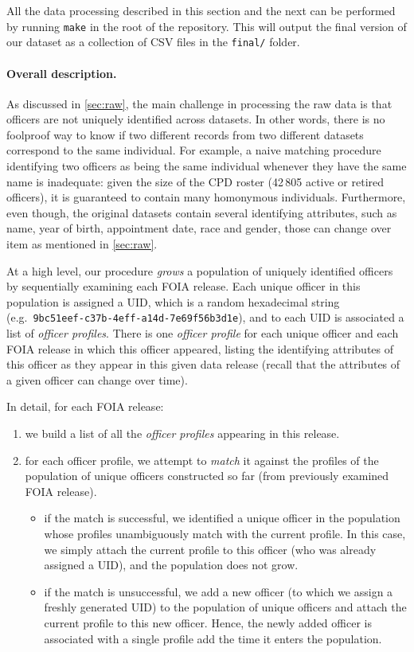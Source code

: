 All the data processing described in this section and the next can be performed
by running \texttt{make} in the root of the repository. This will output the
final version of our dataset as a collection of CSV files in the
\texttt{final/} folder.

\paragraph{Overall description.}
As discussed in \cref{sec:raw}, the main challenge in processing the raw data
is that officers are not uniquely identified across datasets. In other words,
there is no foolproof way to know if two different records from two different
datasets correspond to the same individual. For example, a naive matching
procedure identifying two officers as being the same individual whenever they
have the same name is inadequate: given the size of the CPD roster (42\,805
active or retired officers), it is guaranteed to contain many homonymous
individuals. Furthermore, even though, the original datasets contain several
identifying attributes, such as name, year of birth, appointment date, race and
gender, those can change over item as mentioned in \cref{sec:raw}.

At a high level, our procedure \emph{grows} a population of uniquely identified
officers by sequentially examining each FOIA release. Each unique officer in
this population is assigned a UID, which is a random hexadecimal string (e.g.\
\texttt{9bc51eef-c37b-4eff-a14d-7e69f56b3d1e}), and to each UID is associated
a list of \emph{officer profiles}. There is one \emph{officer profile} for each
unique officer and each FOIA release in which this officer appeared, listing
the identifying attributes of this officer as they appear in this given data
release (recall that the attributes of a given officer can change over time).

In detail, for each FOIA release:
\begin{enumerate}
	\item we build a list of all the \emph{officer profiles} appearing in this
		release.
	\item for each officer profile, we attempt to \emph{match} it against the
		profiles of the population of unique officers constructed so far (from
		previously examined FOIA release).
		\begin{itemize}
			\item if the match is successful, we identified a unique officer in
				the population whose profiles unambiguously match with the
				current profile. In this case, we simply attach the current
				profile to this officer (who was already assigned a UID), and
				the population does not grow.
			\item if the match is unsuccessful, we add a new officer (to which
				we assign a freshly generated UID) to the population of unique
				officers and attach the current profile to this new officer.
				Hence, the newly added officer is associated with a single
				profile add the time it enters the population.
		\end{itemize}
\end{enumerate}

